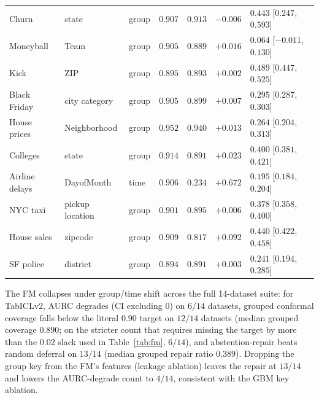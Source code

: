 \documentclass[pdflatex,sn-mathphys-num]{sn-jnl}
\begin{document}
\begin{table}[htbp]
\begin{tabular}{lllrrrl}
Churn                 & state               & group & $0.907$ & $0.913$ & $-0.006$ & $0.443$ [$0.247$, $0.593$] \\
Moneyball             & Team                & group & $0.905$ & $0.889$ & $+0.016$ & $0.064$ [$-0.011$, $0.130$] \\
Kick                  & ZIP                 & group & $0.895$ & $0.893$ & $+0.002$ & $0.489$ [$0.447$, $0.525$] \\
Black Friday          & city category       & group & $0.905$ & $0.899$ & $+0.007$ & $0.295$ [$0.287$, $0.303$] \\
House prices          & Neighborhood        & group & $0.952$ & $0.940$ & $+0.013$ & $0.264$ [$0.204$, $0.313$] \\
Colleges              & state               & group & $0.914$ & $0.891$ & $+0.023$ & $0.400$ [$0.381$, $0.421$] \\
Airline delays        & DayofMonth          & time  & $0.906$ & $0.234$ & $+0.672$ & $0.195$ [$0.184$, $0.204$] \\
NYC taxi              & pickup location     & group & $0.901$ & $0.895$ & $+0.006$ & $0.378$ [$0.358$, $0.400$] \\
House sales           & zipcode             & group & $0.909$ & $0.817$ & $+0.092$ & $0.440$ [$0.422$, $0.458$] \\
SF police             & district            & group & $0.894$ & $0.891$ & $+0.003$ & $0.241$ [$0.194$, $0.285$] \\
\bottomrule
\end{tabular}
\end{table}

The FM collapses under group/time shift across the full 14-dataset suite: for TabICLv2, AURC degrades
(CI excluding 0) on $6/14$ datasets, grouped conformal coverage falls below the literal $0.90$ target on
$12/14$ datasets (median grouped coverage $0.890$; on the stricter count that requires missing the target by
more than the $0.02$ slack used in Table~\ref{tab:fm}, $6/14$), and abstention-repair beats random deferral on
$13/14$ (median grouped repair ratio $0.389$). Dropping the group key from the FM's features (leakage ablation)
leaves the repair at $13/14$ and lowers the AURC-degrade count to $4/14$, consistent with the GBM key ablation.
\end{document}
